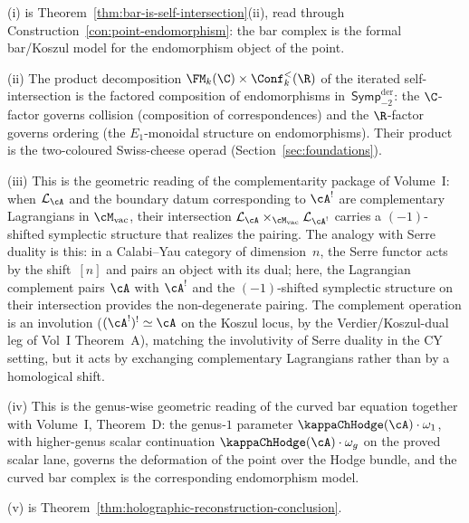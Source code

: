 \begin{remark}[Evidence]
(i) is Theorem~\ref{thm:bar-is-self-intersection}(ii), read through
Construction~\ref{con:point-endomorphism}: the bar complex is the
formal bar/Koszul model for the endomorphism object of the point.

(ii) The product decomposition
$\FM_k(\C) \times \Conf_k^{<}(\R)$ of the iterated
self-intersection is the factored composition of endomorphisms
in~$\mathsf{Symp}^{\mathrm{der}}_{-2}$: the $\C$-factor governs
collision (composition of correspondences) and the $\R$-factor
governs ordering (the $E_1$-monoidal structure on endomorphisms).
Their product is the two-coloured Swiss-cheese operad
(Section~\ref{sec:foundations}).

(iii) This is the geometric reading of the complementarity package
of Volume~I: when $\cL_\cA$ and the boundary datum corresponding to
$\cA^!$ are complementary Lagrangians in $\Mvac$, their intersection
$\cL_\cA \times_{\Mvac} \cL_{\cA^!}$ carries a $(-1)$-shifted
symplectic structure that realizes the pairing.
The analogy with Serre duality is this: in a Calabi--Yau category
of dimension~$n$, the Serre functor acts by the shift~$[n]$ and
pairs an object with its dual; here, the Lagrangian complement
pairs $\cA$ with $\cA^!$ and the $(-1)$-shifted symplectic
structure on their intersection provides the non-degenerate
pairing. The complement operation is an involution
($(\cA^!)^! \simeq \cA$ on the Koszul locus, by the Verdier/Koszul-dual
leg of Vol~I Theorem~A),
matching the involutivity of Serre duality in the CY setting, but
it acts by exchanging complementary Lagrangians rather than by a
homological shift.

(iv) This is the genus-wise geometric reading of the curved bar
equation together with Volume~I, Theorem~D: the genus-$1$
parameter $\kappaChHodge(\cA) \cdot \omega_1$, with higher-genus scalar
continuation $\kappaChHodge(\cA) \cdot \omega_g$ on the proved scalar
lane, governs the deformation of the point over
the Hodge bundle, and the curved bar complex is the corresponding
endomorphism model.

(v) is Theorem~\ref{thm:holographic-reconstruction-conclusion}.
\end{remark}

